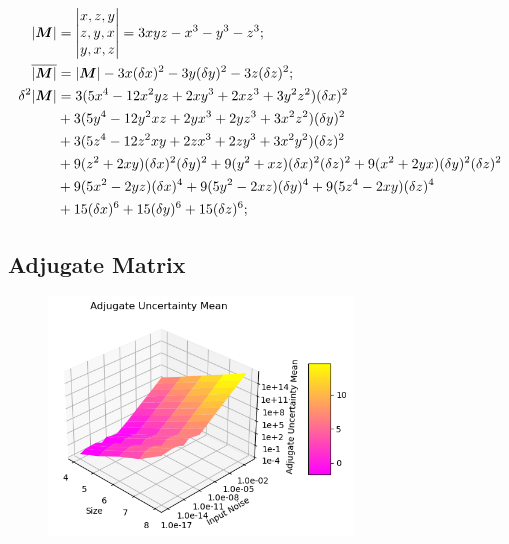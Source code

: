 \documentclass[twoside]{article}
\numberwithin{equation}{section}
\begin{document}
\begin{align}
\label{eqn: special determinant}
|\protect{\textrm{\boldmath $M$}}| &= \left| \begin{matrix} x, z, y \\ z, y, x \\ y, x, z \end{matrix} \right| = 3 x y z - x^3 - y^3 - z^3; \\
\label{eqn: special determinant mean}
\overline{|\protect{\textrm{\boldmath $M$}}|} &= |\protect{\textrm{\boldmath $M$}}| - 3 x (\delta x)^2 - 3 y (\delta y)^2 - 3 z (\delta z)^2; \\
\label{eqn: special determinant variance}
\delta^2 |\protect{\textrm{\boldmath $M$}}| &= 3 (5 x^4 - 12 x^2 y z + 2 x y^3 + 2 x z^3 + 3 y^2 z^2)(\delta x)^2 \\
 	&+ 3 (5 y^4 - 12 y^2 x z + 2 y x^3 + 2 y z^3 + 3 x^2 z^2)(\delta y)^2 \nonumber \\
 	&+ 3 (5 z^4 - 12 z^2 x y + 2 z x^3 + 2 z y^3 + 3 x^2 y^2)(\delta z)^2 \nonumber \\
 	&+ 9 (z^2 + 2 x y)(\delta x)^2 (\delta y)^2 + 9 (y^2 + x z) (\delta x)^2 (\delta z)^2 + 9 (x^2 +2 y x) (\delta y)^2 (\delta z)^2 \nonumber \\
 	&+ 9 (5 x^2 - 2 y z) (\delta x)^4 + 9 (5 y^2 - 2 x z) (\delta y)^4 + 9 (5z^4 - 2 x y) (\delta z)^4 \nonumber \\
    &+ 15 (\delta x)^6 + 15 (\delta y)^6 + 15 (\delta z)^6 \nonumber;
\end{align}




\subsection{Adjugate Matrix}

\begin{figure}[p]
\centering
\includegraphics[height=2.5in]{Adjugate_Uncertainty_vs_Size_Noise.png} 
\label{fig: Adjugate_Uncertainty_vs_Size_Noise}
\end{figure}
\end{document}
